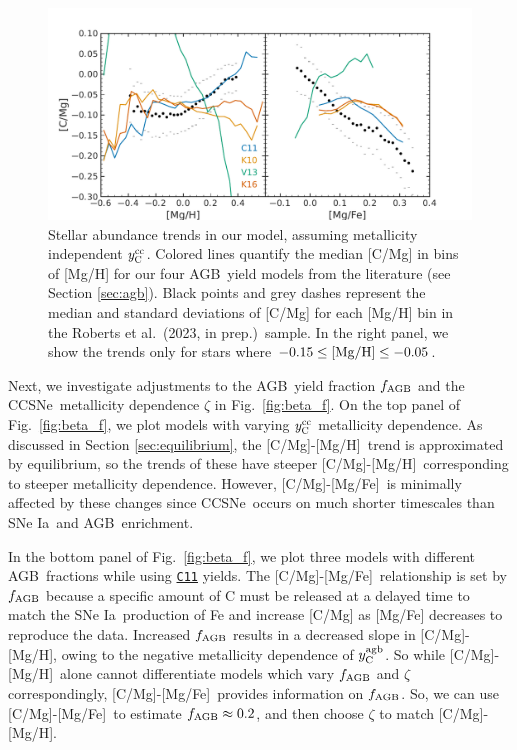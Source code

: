 \documentclass[fleqn,usenatbib]{mnras}
\newcommand{\citetjack}{Roberts et al.~(2023, in prep.)}
\newcommand{\cxi}{\texttt{\hyperlink{C11}{C11}}}
\newcommand{\cc}{CCSNe}
\newcommand{\agb}{AGB}
\newcommand{\ia}{SNe Ia}
\newcommand{\caah}{[C/Mg]-[Mg/H]}
\newcommand{\caafe}{[C/Mg]-[Mg/Fe]}
\newcommand{\Ycc}{\ensuremath{y_{\rm C}^{\rm cc}}}
\newcommand{\Ycagb}{\ensuremath{y_{\rm C}^{\rm agb}}}
\begin{document}
\begin{figure}
\centering
\includegraphics{agb_oob.pdf}
\caption[Median Stellar Abundance Trends]{
    Stellar abundance trends in our model, assuming metallicity independent $\Ycc$. Colored lines quantify the median [C/Mg] in bins of [Mg/H] for our four \agb\ yield models from the literature (see Section \ref{sec:agb}). Black points and grey dashes represent the median and standard deviations of [C/Mg] for each [Mg/H] bin in the \citetjack~sample. In the right panel, we show the trends only for stars where $-0.15\leq {\rm [Mg/H]}\leq -0.05$.
}
\label{fig:agb_sims}
\end{figure}


Next, we investigate adjustments to the \agb\ yield fraction $f_{\rm AGB}$ and the \cc\ metallicity dependence $\zeta$ in Fig.~\ref{fig:beta_f}. On the top panel of Fig.~\ref{fig:beta_f}, we plot models with varying $\Ycc$ metallicity dependence. As discussed in Section \ref{sec:equilibrium}, the \caah~trend is approximated by equilibrium, so the trends of these have steeper \caah~corresponding to steeper metallicity dependence. However, \caafe~is minimally affected by these changes since \cc\ occurs on much shorter timescales than \ia\ and \agb\ enrichment.

In the bottom panel of Fig.~\ref{fig:beta_f}, we plot three models with different \agb\ fractions while using \cxi{} yields.  The \caafe~relationship is set by $f_{\rm AGB}$ because a specific amount of C must be released at a delayed time to match the \ia\ production of Fe and increase [C/Mg] as [Mg/Fe] decreases to reproduce the data.
Increased $f_{\rm AGB}$ results in a decreased slope in \caah, owing to the negative metallicity dependence of $\Ycagb$. So while \caah~alone cannot differentiate models which vary $f_{\rm AGB}$ and $\zeta$ correspondingly, \caafe~provides information on $f_{\rm AGB}$. So, we can use \caafe~to estimate $f_{\rm AGB}\approx 0.2$, and then choose $\zeta$ to match \caah.
\end{document}
